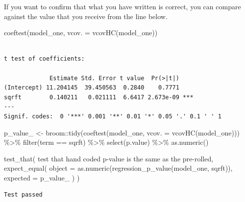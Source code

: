 \documentclass[
  letterpaper,
  DIV=11,
  numbers=noendperiod]{scrreprt}
\newenvironment{Shaded}{\begin{snugshade}}{\end{snugshade}}
\newcommand{\AttributeTok}[1]{\textcolor[rgb]{0.40,0.45,0.13}{#1}}
\newcommand{\FunctionTok}[1]{\textcolor[rgb]{0.28,0.35,0.67}{#1}}
\newcommand{\NormalTok}[1]{\textcolor[rgb]{0.00,0.23,0.31}{#1}}
\newcommand{\OtherTok}[1]{\textcolor[rgb]{0.00,0.23,0.31}{#1}}
\newcommand{\SpecialCharTok}[1]{\textcolor[rgb]{0.37,0.37,0.37}{#1}}
\newcommand{\StringTok}[1]{\textcolor[rgb]{0.13,0.47,0.30}{#1}}
\begin{document}
If you want to confirm that what you have written is correct, you can
compare against the value that you receive from the line below.

\begin{Shaded}
\begin{Highlighting}[]
\FunctionTok{coeftest}\NormalTok{(model\_one, }\AttributeTok{vcov. =} \FunctionTok{vcovHC}\NormalTok{(model\_one))}
\end{Highlighting}
\end{Shaded}

\begin{verbatim}

t test of coefficients:

             Estimate Std. Error t value  Pr(>|t|)    
(Intercept) 11.204145  39.450563  0.2840    0.7771    
sqrft        0.140211   0.021111  6.6417 2.673e-09 ***
---
Signif. codes:  0 '***' 0.001 '**' 0.01 '*' 0.05 '.' 0.1 ' ' 1
\end{verbatim}

\begin{Shaded}
\begin{Highlighting}[]
\NormalTok{p\_value\_ }\OtherTok{\textless{}{-}}\NormalTok{ broom}\SpecialCharTok{::}\FunctionTok{tidy}\NormalTok{(}\FunctionTok{coeftest}\NormalTok{(model\_one, }\AttributeTok{vcov. =} \FunctionTok{vcovHC}\NormalTok{(model\_one))) }\SpecialCharTok{\%\textgreater{}\%} 
  \FunctionTok{filter}\NormalTok{(term }\SpecialCharTok{==} \StringTok{\textquotesingle{}sqrft\textquotesingle{}}\NormalTok{) }\SpecialCharTok{\%\textgreater{}\%} 
  \FunctionTok{select}\NormalTok{(}\StringTok{\textquotesingle{}p.value\textquotesingle{}}\NormalTok{) }\SpecialCharTok{\%\textgreater{}\%} 
  \FunctionTok{as.numeric}\NormalTok{()}

\FunctionTok{test\_that}\NormalTok{(}
  \StringTok{\textquotesingle{}test that hand coded p{-}value is the same as the pre{-}rolled\textquotesingle{}}\NormalTok{, }
  \FunctionTok{expect\_equal}\NormalTok{(}
    \AttributeTok{object   =} \FunctionTok{as.numeric}\NormalTok{(}\FunctionTok{regression\_p\_value}\NormalTok{(model\_one, }\StringTok{\textquotesingle{}sqrft\textquotesingle{}}\NormalTok{)), }
    \AttributeTok{expected =}\NormalTok{ p\_value\_}
\NormalTok{  )}
\NormalTok{)}
\end{Highlighting}
\end{Shaded}

\begin{verbatim}
Test passed 
\end{verbatim}
\end{document}
